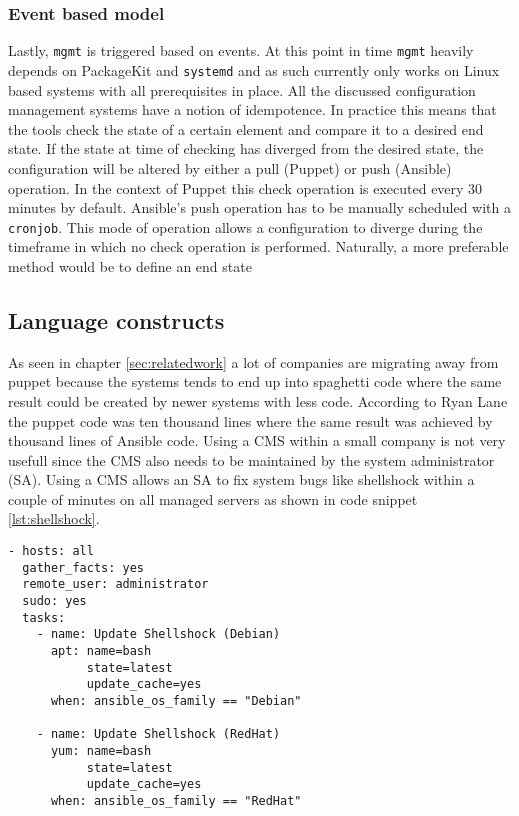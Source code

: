 \subsubsection{Event based model}
Lastly, \texttt{mgmt} is triggered based on events. At this point in time \texttt{mgmt} heavily depends on PackageKit and \texttt{systemd} and as such currently only works on Linux based systems with all prerequisites in place. 
All the discussed configuration management systems have a notion of idempotence. In practice this means that the tools check the state of a certain element and compare it to a desired end state. If the state at time of checking has diverged from the desired state, the configuration will be altered by either a pull (Puppet) or push (Ansible) operation. In the context of Puppet this check operation is executed every 30 minutes by default. Ansible's push operation has to be manually scheduled with a \texttt{cronjob}. This mode of operation allows a configuration to diverge during the timeframe in which no check operation is performed. Naturally, a more preferable method would be to define an end state

\subsection{Language constructs}
As seen in chapter \ref{sec:relatedwork} a lot of companies are migrating away from puppet because the systems tends to end up into spaghetti code \cite{movingawayfrompuppet} where the same result could be created by newer systems with less code. According to Ryan Lane \cite{movingawayfrompuppet} the puppet code was ten thousand lines where the same result was achieved by thousand lines of Ansible code. Using a CMS within a small company is not very usefull since the CMS also needs to be maintained by the system administrator (SA). Using a CMS allows an SA to fix system bugs like shellshock within a couple of minutes on all managed servers as shown in code snippet \ref{lst:shellshock}.

\begin{lstlisting}[caption={Shellshock security patching with Ansible playbook},label=lst:shellshock]
- hosts: all
  gather_facts: yes
  remote_user: administrator
  sudo: yes
  tasks:
    - name: Update Shellshock (Debian)
      apt: name=bash
           state=latest
           update_cache=yes
      when: ansible_os_family == "Debian"
 
    - name: Update Shellshock (RedHat)
      yum: name=bash
           state=latest
           update_cache=yes
      when: ansible_os_family == "RedHat"
\end{lstlisting}

